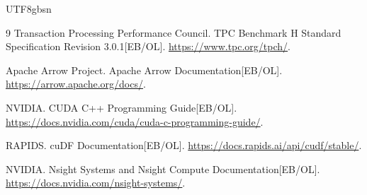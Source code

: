 \documentclass[10.5pt,compsoc]{CjC}
\begin{document}
\begin{CJK*}{UTF8}{gbsn}
\begin{thebibliography}{9}
Transaction Processing Performance Council. TPC Benchmark H Standard
Specification Revision 3.0.1[EB/OL]. \url{https://www.tpc.org/tpch/}.

Apache Arrow Project. Apache Arrow Documentation[EB/OL].
\url{https://arrow.apache.org/docs/}.

NVIDIA. CUDA C++ Programming Guide[EB/OL].
\url{https://docs.nvidia.com/cuda/cuda-c-programming-guide/}.

RAPIDS. cuDF Documentation[EB/OL].
\url{https://docs.rapids.ai/api/cudf/stable/}.

NVIDIA. Nsight Systems and Nsight Compute Documentation[EB/OL].
\url{https://docs.nvidia.com/nsight-systems/}.
\end{thebibliography}

\end{CJK*}
\end{document}
